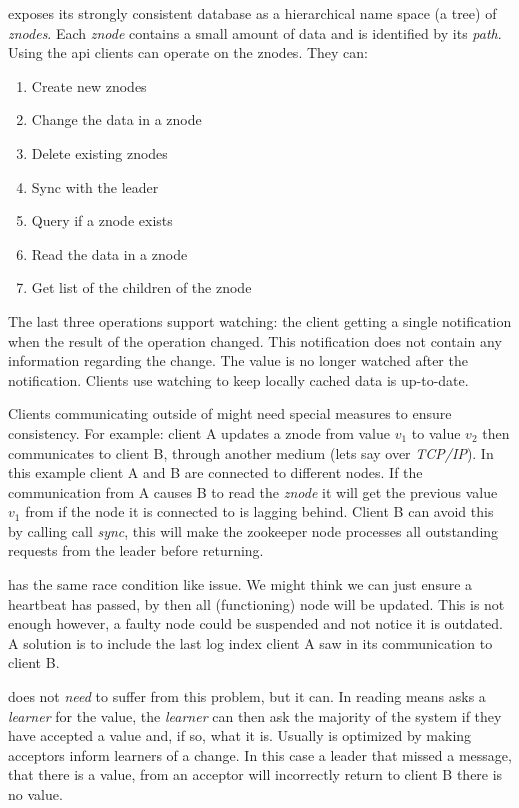 \zookeeper{} exposes its strongly consistent database as a hierarchical name space (a tree) of \textsl{znodes}. Each \textsl{znode} contains a small amount of data and is identified by its \textsl{path}. Using the \ac{api} clients can operate on the znodes. They can: 
%
\begin{multicols}{2}
\begin{enumerate}
	\item Create new znodes
	\item Change the data in a znode
	\item Delete existing znodes
	\item Sync with the leader
	\item Query if a znode exists
	\item Read the data in a znode
	\item Get list of the children of the znode
\end{enumerate}
\end{multicols}
%
The last three operations support watching: the client getting a single notification when the result of the operation changed. This notification does not contain any information regarding the change. The value is no longer watched after the notification. Clients use watching to keep locally cached data is up-to-date. 

Clients communicating outside of \zookeeper{} might need special measures to ensure consistency. For example: client A updates a znode from value $v_1$ to value $v_2$ then communicates to client B, through another medium (lets say over \textsl{TCP/IP}). In this example client A and B are connected to different \zookeeper{} nodes. If the communication from A causes B to read the \textsl{znode} it will get the previous value $v_1$ from \zookeeper{} if the node it is connected to is lagging behind. Client B can avoid this by calling call \textit{sync}, this will make the zookeeper node processes all outstanding requests from the leader before returning.

\raft{} has the same race condition like issue. We might think we can just ensure a heartbeat has passed, by then all (functioning) node will be updated. This is not enough however, a faulty node could be suspended and not notice it is outdated. A solution is to include the last log index client A saw in its communication to client B. 

\paxos{} does not \textit{need} to suffer from this problem, but it can. In \paxos{} reading means asks a \textit{learner} for the value, the \textit{learner} can then ask the majority of the system if they have accepted a value and, if so, what it is. Usually \paxos{} is optimized by making acceptors inform learners of a change. In this case a leader that missed a message, that there is a value, from an acceptor will incorrectly return to client B there is no value.
